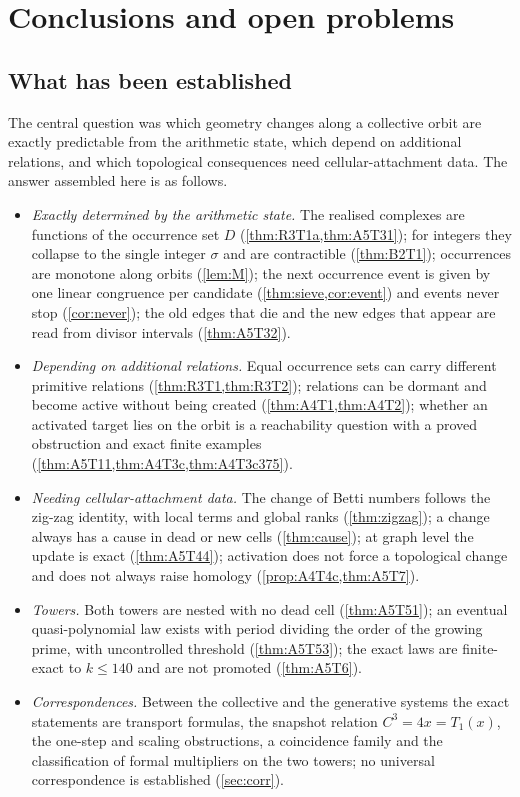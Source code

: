 \section{Conclusions and open problems}\label{sec:concl}
\subsection{What has been established}
The central question was which geometry changes along a collective orbit are exactly predictable from the arithmetic state, which depend on additional relations, and which topological consequences need cellular-attachment data. The answer assembled here is as follows.
\begin{itemize}[itemsep=2pt]
\item \emph{Exactly determined by the arithmetic state.} The realised complexes are functions of the occurrence set $D$ (\cref{thm:R3T1a,thm:A5T31}); for integers they collapse to the single integer $\sigma$ and are contractible (\cref{thm:B2T1}); occurrences are monotone along orbits (\cref{lem:M}); the next occurrence event is given by one linear congruence per candidate (\cref{thm:sieve,cor:event}) and events never stop (\cref{cor:never}); the old edges that die and the new edges that appear are read from divisor intervals (\cref{thm:A5T32}).
\item \emph{Depending on additional relations.} Equal occurrence sets can carry different primitive relations (\cref{thm:R3T1,thm:R3T2}); relations can be dormant and become active without being created (\cref{thm:A4T1,thm:A4T2}); whether an activated target lies on the orbit is a reachability question with a proved obstruction and exact finite examples (\cref{thm:A5T11,thm:A4T3c,thm:A4T3c375}).
\item \emph{Needing cellular-attachment data.} The change of Betti numbers follows the zig-zag identity, with local terms and global ranks (\cref{thm:zigzag}); a change always has a cause in dead or new cells (\cref{thm:cause}); at graph level the update is exact (\cref{thm:A5T44}); activation does not force a topological change and does not always raise homology (\cref{prop:A4T4c,thm:A5T7}).
\item \emph{Towers.} Both towers are nested with no dead cell (\cref{thm:A5T51}); an eventual quasi-polynomial law exists with period dividing the order of the growing prime, with uncontrolled threshold (\cref{thm:A5T53}); the exact laws are finite-exact to $k\le140$ and are not promoted (\cref{thm:A5T6}).
\item \emph{Correspondences.} Between the collective and the generative systems the exact statements are transport formulas, the snapshot relation $C^3=4x=T_1(x)$, the one-step and scaling obstructions, a coincidence family and the classification of formal multipliers on the two towers; no universal correspondence is established (\cref{sec:corr}).
\end{itemize}
